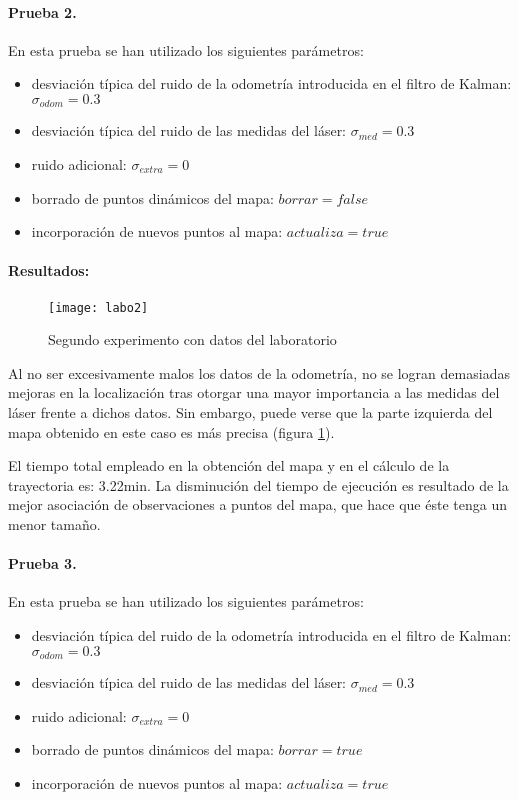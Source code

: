 \paragraph{Prueba 2.}
En esta prueba se han utilizado los siguientes parámetros:
\begin{itemize}
  \item desviación típica del ruido de la odometría introducida en el filtro de Kalman: $\sigma_{odom} = 0.3$
  \item desviación típica del ruido de las medidas del láser: $\sigma_{med} = 0.3$
  \item ruido adicional: $\sigma_{extra} = 0$
  \item borrado de puntos dinámicos del mapa: $borrar = false$
  \item incorporación de nuevos puntos al mapa: $actualiza = true$
\end{itemize}


\paragraph{Resultados:}

\begin{figure}[h]
  \centering\texttt{[image: labo2]}\\
  \caption{Segundo experimento con datos del laboratorio}\label{fg:labo2}
\end{figure}

Al no ser excesivamente malos los datos de la odometría, no se logran demasiadas mejoras en la localización tras otorgar una mayor importancia a las medidas del láser frente a dichos datos. Sin embargo, puede verse que la parte izquierda del mapa obtenido en este caso es más precisa (figura \ref{fg:labo2}).

El tiempo total empleado en la obtención del mapa y en el cálculo de la trayectoria es: 3.22min. La disminución del tiempo de ejecución es resultado de la mejor asociación de observaciones a puntos del mapa, que hace que éste tenga un menor tamaño.

\paragraph{Prueba 3.}
En esta prueba se han utilizado los siguientes parámetros:
\begin{itemize}
  \item desviación típica del ruido de la odometría introducida en el filtro de Kalman: $\sigma_{odom} = 0.3$
  \item desviación típica del ruido de las medidas del láser: $\sigma_{med} = 0.3$
  \item ruido adicional: $\sigma_{extra} = 0$
  \item borrado de puntos dinámicos del mapa: $borrar = true$
  \item incorporación de nuevos puntos al mapa: $actualiza = true$
\end{itemize}



